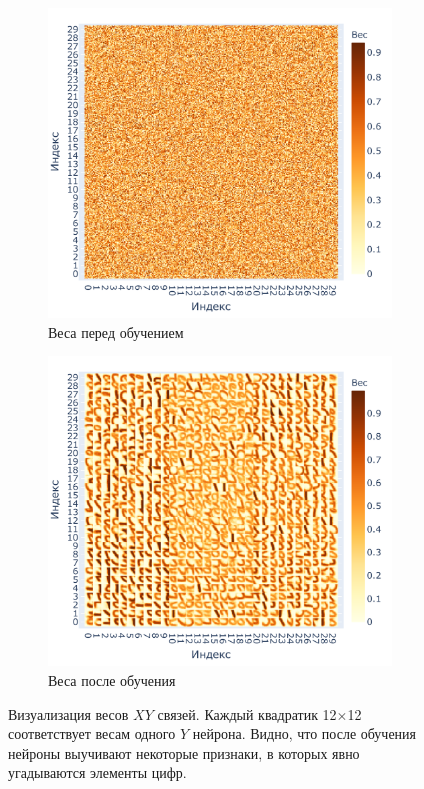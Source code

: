 \documentclass[a4paper]{article}
\begin{document}
{\begin{figure}[H]
\centering
\begin{subfigure}{0.45\textwidth}
    \includegraphics[width=\textwidth,keepaspectratio=true]{weights_XY_untrained_ru.pdf}
    \caption{Веса перед обучением}
\end{subfigure}
\begin{subfigure}{0.45\textwidth}  \label{weights_XY}
    \includegraphics[width=\textwidth,keepaspectratio=true]{weights_XY_ru.pdf}
    \caption{Веса после обучения}
\end{subfigure}
\caption{Визуализация весов $XY$ связей. Каждый квадратик 12$\times$12 соответствует весам одного $Y$ нейрона. Видно, что после обучения нейроны выучивают некоторые признаки, в которых явно угадываются элементы цифр.}
\end{figure}

}
\end{document}
